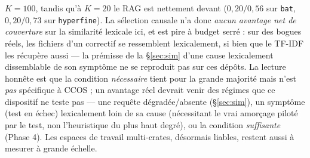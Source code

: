 \documentclass[11pt]{article}
\newcommand{\code}[1]{\texttt{#1}}
\begin{document}
$K{=}100$, tandis qu'à $K{=}20$ le RAG est nettement devant ($0{,}20/0{,}56$ sur
\code{bat}, $0{,}20/0{,}73$ sur \code{hyperfine}). La sélection causale n'a donc
\emph{aucun avantage net de couverture} sur la similarité lexicale ici, et est pire à
budget serré : sur des bogues réels, les fichiers d'un correctif se ressemblent
lexicalement, si bien que le TF-IDF les récupère aussi --- la prémisse de la
\S\ref{sec:sim} d'une cause lexicalement dissemblable de son symptôme ne se reproduit pas
sur ces dépôts. La lecture honnête est que la condition \emph{nécessaire} tient pour la
grande majorité mais n'est \emph{pas} spécifique à CCOS ; un avantage réel devrait venir
des régimes que ce dispositif ne teste pas --- une requête dégradée/absente
(\S\ref{sec:sim}), un symptôme (test en échec) lexicalement loin de sa cause (nécessitant
le vrai amorçage piloté par le test, non l'heuristique du plus haut degré), ou la
condition \emph{suffisante} (Phase 4). Les espaces de travail multi-crates, désormais
liables, restent aussi à mesurer à grande échelle.
\end{document}
